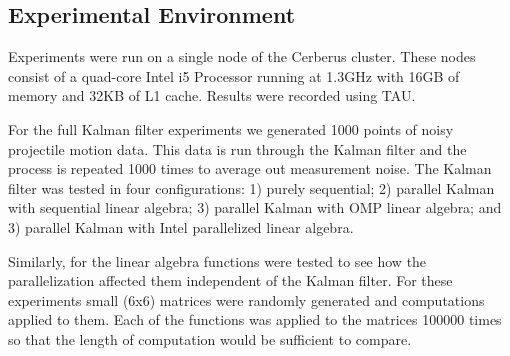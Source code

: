 \subsection{Experimental Environment}
 Experiments were run on a single node of the Cerberus cluster. These nodes consist of a quad-core Intel i5 Processor running at 1.3GHz with 16GB of memory and 32KB of L1 cache. Results were recorded using TAU.

For the full Kalman filter experiments we generated 1000 points of noisy projectile motion data. This data is run through the Kalman filter and the process is repeated 1000 times to average out measurement noise. The Kalman filter was tested in four configurations: 1) purely sequential; 2) parallel Kalman with sequential linear algebra; 3) parallel Kalman with OMP linear algebra; and 3) parallel Kalman with Intel parallelized linear algebra.

Similarly, for the linear algebra functions were tested to see how the parallelization affected them independent of the Kalman filter. For these experiments small (6x6) matrices were randomly generated and computations applied to them. Each of the functions was applied to the matrices 100000 times so that the length of computation would be sufficient to compare. 
